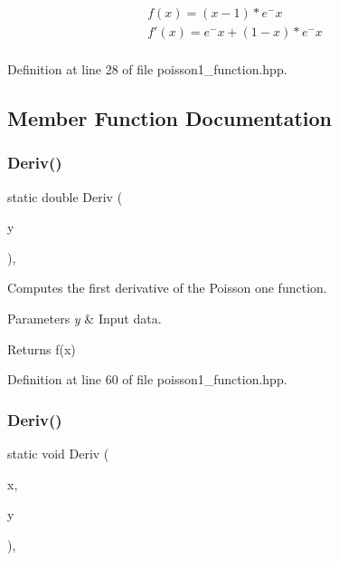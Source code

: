\begin{eqnarray*} f(x) = (x - 1) * e^-x \\ f'(x) = e^-x + (1 - x) * e^-x \\ \end{eqnarray*} 

Definition at line 28 of file poisson1\+\_\+function.\+hpp.



\subsection{Member Function Documentation}
\mbox{\label{classmlpack_1_1ann_1_1Poisson1Function_a163d34fd09f8edf457164f5033c635cf}} 
\subsubsection{Deriv()\hspace{0.1cm}{\footnotesize\ttfamily [1/2]}}
{\footnotesize\ttfamily static double Deriv (\begin{DoxyParamCaption}\item[{const double}]{y }\end{DoxyParamCaption})\hspace{0.3cm}{\ttfamily [inline]}, {\ttfamily [static]}}



Computes the first derivative of the Poisson one function. 


\begin{DoxyParams}{Parameters}
{\em y} & Input data. \\
\hline
\end{DoxyParams}
\begin{DoxyReturn}{Returns}
f\textquotesingle{}(x) 
\end{DoxyReturn}


Definition at line 60 of file poisson1\+\_\+function.\+hpp.

\mbox{\label{classmlpack_1_1ann_1_1Poisson1Function_a0ad035ec996acd7025807d0e9e082887}} 
\subsubsection{Deriv()\hspace{0.1cm}{\footnotesize\ttfamily [2/2]}}
{\footnotesize\ttfamily static void Deriv (\begin{DoxyParamCaption}\item[{const Input\+Vec\+Type \&}]{x,  }\item[{Output\+Vec\+Type \&}]{y }\end{DoxyParamCaption})\hspace{0.3cm}{\ttfamily [inline]}, {\ttfamily [static]}}



